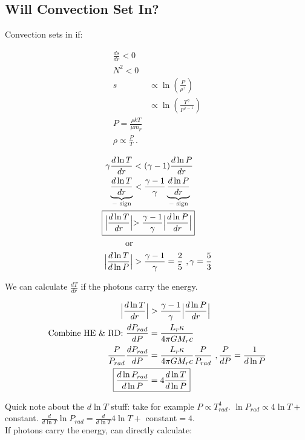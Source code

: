 \documentclass[10pt,letterpaper,final]{book}
\newcommand{\pt}{\propto}
\newcommand{\rp}{\right)}
\newcommand{\lp}{\left(}
\begin{document}
\subsection{Will Convection Set In?}

Convection sets in if:

\begin{align}
\frac{ds}{dr} < 0\\
N^2 < 0\\
s &\pt \ln \lp \frac{P}{\rho^\gamma} \rp\\
 &\pt \ln \lp \frac{T^\gamma}{P^{\gamma -1}} \rp\\
P = \frac{\rho kT}{\mu m_p}\\
\rho \pt \frac{P}{T}~.
\end{align}

\begin{align}
\gamma \frac{d \ln T}{dr} &< ( \gamma - 1) \frac{d \ln P}{dr}\\
\underbrace{\frac{d \ln T}{dr}}_{\text{$-$ sign}} &< \frac{\gamma -1}{\gamma}\underbrace{\frac{d \ln P}{dr}}_{\text{$-$ sign}}\\
\Aboxed{\Bigl\lvert \frac{d \ln T}{dr} \Bigl\lvert &> \frac{\gamma -1}{\gamma} \Bigl\lvert \frac{d \ln P}{dr} \Bigl\lvert} \\
\text{or}\\
\Bigl\lvert \frac{d \ln T}{d \ln P	} \Bigl\lvert &> \frac{\gamma - 1}{\gamma} = \frac{2}{5}~,\gamma = \frac{5}{3}
\end{align}

We can calculate $\frac{dT}{dr}$ if the photons carry the energy.

\begin{align}
\Bigl\lvert \frac{d \ln T}{dr} \Bigl\lvert &> \frac{\gamma -1}{\gamma} \Bigl\lvert \frac{d \ln P}{dr} \Bigl\lvert\\
\text{Combine HE \& RD: } \frac{dP_{rad}}{dP} &= \frac{L_r \kappa}{4 \pi GM_r c}\\
\frac{P}{P_{rad}}\frac{dP_{rad}}{dP} &= \frac{L_r \kappa}{4 \pi GM_r c}\frac{P}{P_{rad}}~,\frac{P}{dP} = \frac{1}{d \ln P}\\
\Aboxed{\frac{d \ln P_{rad}}{d \ln P} &=4 \frac{d \ln T}{d \ln P}}
\end{align}

Quick note about the $d \ln T$ stuff: take for example $P\pt T_{rad}^4$. $\ln P_{rad} \pt 4 \ln T +$ constant. $\frac{d}{d \ln T} \ln P_{rad} = \frac{d}{d \ln T}4 \ln T +$ constant$= 4$.\\
If photons carry the energy, can directly calculate: 
\end{document}

